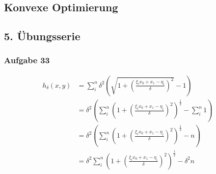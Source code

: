 \documentclass[paper=A3, 
   paper=landscape,]{scrartcl}
\begin{document}
\begin{center}
	\section*{Konvexe Optimierung}
	\subsection*{5. Übungsserie}
\end{center}

\subsubsection*{Aufgabe 33}


\newcommand{\thefunc}{\xi_i^2 x_0^2 + 2 \xi_i x_0 x_1 - 2\xi_i x_0 \eta_i + x_1^2 -2 x_1 \eta_i   + \eta_i^2}
\newcommand{\z}{\xi_i x_0 + x_1 -\eta_i}


 \begin{align*}
 h_\delta(x,y) 	&= \sum\limits_i^n \delta^2 \left( \sqrt{1+\left( \frac { \xi_i x_0 + x_1 -\eta_i}{\delta} \right)^2} -1 \right)\\
 				&= \delta^2 \left( \sum\limits_i^n \left(1+\left( \frac { \xi_i x_0 + x_1 -\eta_i}{\delta} \right)^2\right)^\frac{1}{2} -\sum\limits_i^n 1 \right)\\
 				&= \delta^2 \left( \sum\limits_i^n \left(1+\left( \frac { \xi_i x_0 + x_1 -\eta_i}{\delta} \right)^2\right)^\frac{1}{2} -n \right)\\
 				&= \delta^2 \sum\limits_i^n \left(1+\left( \frac { \xi_i x_0 + x_1 -\eta_i}{\delta} \right)^2\right)^\frac{1}{2} - \delta^2 n \\
\end{align*}
\newcommand{\dfunca}{2\xi_i^2 x_0 + 2 \xi_i x_1 - 2\xi_i \eta_i -2 x_1 \eta_i}
\end{document}
